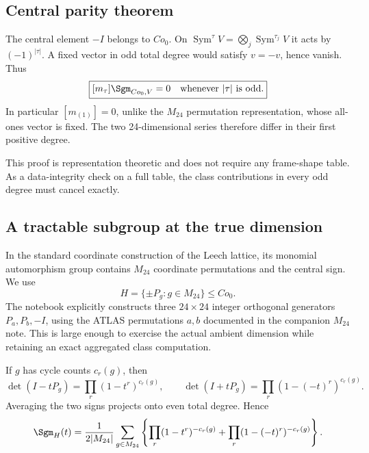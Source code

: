 \documentclass[10pt]{article}
\begin{document}
\subsection{Central parity theorem}
The central element $-I$ belongs to $Co_0$.  On
$\operatorname{Sym}^{\tau}V=\bigotimes_j\operatorname{Sym}^{\tau_j}V$ it
acts by $(-1)^{|\tau|}$.  A fixed vector in odd total degree would satisfy
$v=-v$, hence vanish.  Thus
\begin{equation}\label{co0-leech-proof-and-verification:eq:parity}
\boxed{[m_\tau]\Sgm_{Co_0,V}=0\quad\text{whenever }|\tau|\text{ is odd}.}
\end{equation}
In particular $[m_{(1)}]=0$, unlike the $M_{24}$ permutation representation,
whose all-ones vector is fixed.  The two 24-dimensional series therefore
differ in their first positive degree.

This proof is representation theoretic and does not require any frame-shape
table.  As a data-integrity check on a full table, the class contributions in
every odd degree must cancel exactly.

\subsection{A tractable subgroup at the true dimension}
In the standard coordinate construction of the Leech lattice, its monomial
automorphism group contains $M_{24}$ coordinate permutations and the central
sign.  We use
\[
H=\{\pm P_g:g\in M_{24}\}\leq Co_0.
\]
The notebook explicitly constructs three $24\times24$ integer orthogonal
generators $P_a,P_b,-I$, using the ATLAS permutations $a,b$ documented in the
companion $M_{24}$ note.  This is large enough to exercise the actual ambient
dimension while retaining an exact aggregated class computation.

If $g$ has cycle counts $c_r(g)$, then
\[
\det(I-tP_g)=\prod_r(1-t^r)^{c_r(g)},\qquad
\det(I+tP_g)=\prod_r(1-(-t)^r)^{c_r(g)}.
\]
Averaging the two signs projects onto even total degree.  Hence
\begin{equation}\label{co0-leech-proof-and-verification:eq:signed}
\Sgm_H(t)=\frac1{2|M_{24}|}\sum_{g\in M_{24}}
\left\{\prod_r(1-t^r)^{-c_r(g)}+
\prod_r(1-(-t)^r)^{-c_r(g)}\right\}.
\end{equation}
\end{document}

